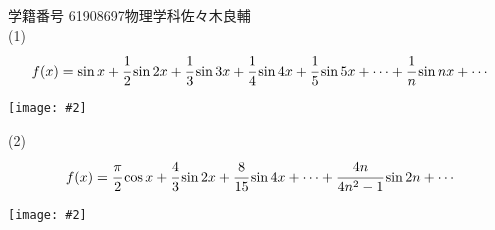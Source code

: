 \documentclass[uplatex,a4j,11pt]{jsarticle}
\makeatletter
\def\fgcaption{\def\@captype{figure}\caption}
\newcommand{\mfig}[3][width=15cm]{
\begin{center}
\texttt{[image: \#2]}
\fgcaption{#3 \label{fig:#2}}
\end{center}
}
\makeatother
\begin{document}
学籍番号 61908697\qquad 物理学科\qquad 佐々木良輔\\
(1)\\
\begin{align*}
  f(x)=\sin x+\cfrac{1}{2}\sin 2x+\cfrac{1}{3}\sin 3x+\cfrac{1}{4}\sin 4x+\cfrac{1}{5}\sin 5x+\cdots+\cfrac{1}{n}\sin nx+\cdots
\end{align*}
\mfig[width=10cm]{fig1.png}{5次までのフーリエ級数}
(2)\\
\begin{align*}
  f(x)=\cfrac{\pi}{2}\cos x+\cfrac{4}{3}\sin 2x+\cfrac{8}{15}\sin 4x+\cdots+\cfrac{4n}{4n^2-1}\sin 2n+\cdots
\end{align*}
\mfig[width=10cm]{fig2.png}{5次までのフーリエ級数}
\end{document}
